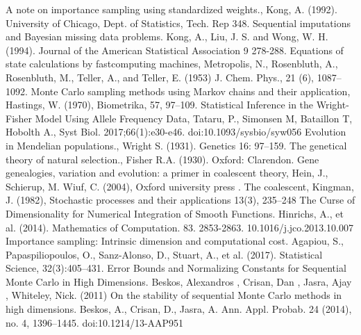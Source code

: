 \documentclass[12pt,mythesisstyle]{report}
\begin{document}
\begin{thebibliography}{99}
	 A note on importance sampling using standardized weights., Kong, A. (1992).  University of Chicago, Dept. of Statistics, Tech. Rep 348.
	 Sequential imputations and Bayesian missing data problems. Kong, A., Liu, J. S. and Wong, W. H. (1994). Journal of the American Statistical Association 9 278-288.
	Equations of state calculations by fastcomputing machines, Metropolis, N., Rosenbluth, A., Rosenbluth, M., Teller, A., and Teller, E. (1953) J. Chem. Phys., 21 (6), 1087–1092.
	 Monte Carlo sampling methods using Markov chains and their application, Hastings, W. (1970), Biometrika, 57, 97–109.
	 Statistical Inference in the Wright-Fisher Model Using Allele Frequency Data, Tataru, P., Simonsen M, Bataillon T, Hobolth A., Syst Biol. 2017;66(1):e30-e46. doi:10.1093/sysbio/syw056
	 Evolution in Mendelian populations., Wright S. (1931).  Genetics 16: 97–159.
	The genetical theory of natural selection., Fisher R.A. (1930). Oxford: Clarendon.
	 Gene genealogies, variation and evolution: a primer in coalescent theory, Hein, J., Schierup, M. Wiuf, C. (2004), Oxford university press .
	 The coalescent, Kingman, J. (1982), Stochastic processes and their applications
	13(3), 235–248
	 The Curse of Dimensionality for Numerical Integration of Smooth Functions. Hinrichs, A., et al. (2014).  Mathematics of Computation. 83. 2853-2863. 10.1016/j.jco.2013.10.007
	 Importance
	sampling: Intrinsic dimension and computational cost. Agapiou, S., Papaspiliopoulos, O., Sanz-Alonso, D., Stuart, A., et al. (2017).  Statistical Science, 32(3):405–431.
	 Error Bounds and Normalizing Constants for Sequential Monte Carlo in
	High Dimensions. Beskos, Alexandros , Crisan, Dan ,  Jasra, Ajay , Whiteley, Nick. (2011)
	 On the stability of sequential Monte Carlo methods in high dimensions. Beskos, A., Crisan, D., Jasra, A. Ann. Appl. Probab. 24 (2014), no. 4, 1396--1445. doi:10.1214/13-AAP951

\end{thebibliography}
\end{document}
